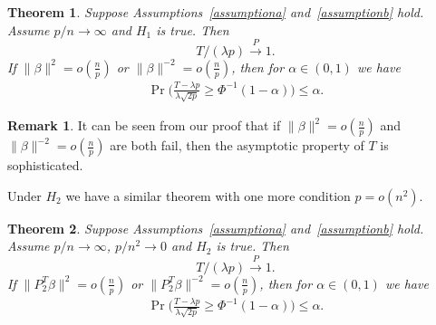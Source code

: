 \documentclass[review]{elsarticle}
\theoremstyle{plain}
\newtheorem{theorem}{\quad\quad Theorem}
\theoremstyle{definition}
\newtheorem{remark}{\quad\quad Remark}
\theoremstyle{remark}
\begin{document}
\begin{theorem}\label{theorema}
    Suppose Assumptions~\ref{assumptiona} and~\ref{assumptionb} hold.
    Assume $p/n \to  \infty$ and $H_1$ is true. Then
            \begin{equation}
                T/(\lambda p) \xrightarrow{P} 1.
            \end{equation}
    If $\|\beta\|^2=o(\frac{{n}}{{p}})$ or $\|\beta\|^{-2}=o(\frac{{n}}{{p}})$, then for $\alpha\in (0,1)$ we have
\begin{equation}
    \begin{aligned}
    \Pr\Big(\frac{T-\lambda p}{\lambda\sqrt{2p}}\geq \Phi^{-1}(1-\alpha)\Big)\leq \alpha.
    \end{aligned}
\end{equation}
\end{theorem}
\begin{remark}
   It can be seen from our proof that if $\|\beta\|^2=o(\frac{{n}}{{p}})$ and $\|\beta\|^{-2}=o(\frac{{n}}{{p}})$ are both fail, then the asymptotic property of $T$ is sophisticated.
\end{remark}
Under $H_2$ we have a similar theorem with one more condition $p=o(n^2)$.
\begin{theorem}\label{theoremb}
    Suppose Assumptions~\ref{assumptiona} and~\ref{assumptionb} hold.
    Assume $p/n \to  \infty$, $p/n^2 \to 0$ and $H_2$ is true. Then
            \begin{equation}
                T/(\lambda p) \xrightarrow{P} 1.
            \end{equation}
    If $\|P_2^T\beta\|^2=o(\frac{{n}}{{p}})$ or $\|P_2^T\beta\|^{-2}=o(\frac{{n}}{{p}})$, then for $\alpha\in (0,1)$ we have
\begin{equation}
    \begin{aligned}
    \Pr\Big(\frac{T-\lambda p}{\lambda\sqrt{2p}}\geq \Phi^{-1}(1-\alpha)\Big)\leq \alpha.
    \end{aligned}
\end{equation}
\end{theorem}
\end{document}

